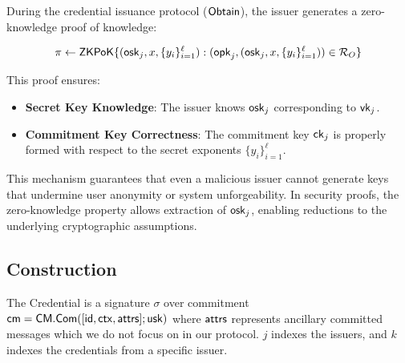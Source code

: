 During the credential issuance protocol ($\mathsf{Obtain}$), the issuer generates a zero-knowledge proof of knowledge:

\[
\pi \gets \mathsf{ZKPoK}\{ (\mathsf{osk}_j, x, \{y_i\}_{i=1}^\ell) : (\mathsf{opk}_j, (\mathsf{osk}_j, x, \{y_i\}_{i=1}^\ell)) \in \mathcal{R}_O \}
\]

This proof ensures:
\begin{itemize}
    \item \textbf{Secret Key Knowledge}: The issuer knows $\mathsf{osk}_j$ corresponding to $\mathsf{vk}_j$.
    \item \textbf{Commitment Key Correctness}: The commitment key $\mathsf{ck}_j$ is properly formed with respect to the secret exponents $\{y_i\}_{i=1}^\ell$.
\end{itemize}

This mechanism guarantees that even a malicious issuer cannot generate keys that undermine user anonymity or system unforgeability. In security proofs, the zero-knowledge property allows extraction of $\mathsf{osk}_j$, enabling reductions to the underlying cryptographic assumptions.


\newpage
\subsection{\MIMCABC Construction}
The Credential is a signature $\sigma$ over commitment $\mathsf{cm} = \mathsf{CM.Com}([\mathsf{id}, \mathsf{ctx}, \mathsf{attrs}]; \mathsf{usk})$ where $\mathsf{attrs}$ represents ancillary committed messages which we do not focus on in our protocol. $j$ indexes the issuers, and $k$ indexes the credentials from a specific issuer. 

